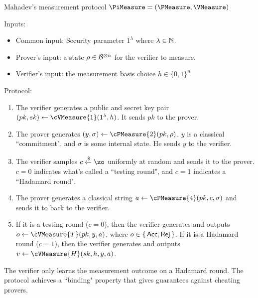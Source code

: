\begin{protocol}{Mahadev's measurement protocol $\PiMeasure=(\PMeasure, \VMeasure)$}
\label{proto:urmila4}


Inputs:
\begin{itemize}
	\item Common input: Security parameter $1^\lambda$ where $\lambda\in\mathbb{N}$.
	\item Prover's input: a state $\rho\in\mathcal{B}^{\otimes n}$ for the verifier to measure.
	\item Verifier's input:
	    the measurement basis choice $h \in \{0,1\}^n$ 
\end{itemize}

Protocol:
\begin{enumerate}
	\item \label{step:measure1} The verifier generates a public and secret key pair $(pk, sk)\leftarrow\cVMeasure{1}(1^\lambda, h)$. It sends $pk$ to the prover.
	\item \label{step:measure2} The prover generates $(y, \sigma)\leftarrow\cPMeasure{2}(pk, \rho)$.
		$y$ is a classical ``commitment", and $\sigma$ is some internal state.
		He sends $y$ to the verifier.
	\item \label{step:measure3} The verifier samples $c\xleftarrow{\$}\zo$ uniformly at random and sends it to the prover. $c=0$ indicates what's called a ``testing round", and $c=1$ indicates a ``Hadamard round".
	\item \label{step:measure4} The prover generates a classical string $a\leftarrow\cPMeasure{4}(pk, c, \sigma)$ and sends it to back to the verifier.
	\item \label{step:output} If it is a testing round ($c=0$), then the verifier generates and outputs $o\leftarrow\cVMeasure{T}(pk, y, a)$, where $o\in\set{\mathsf{Acc}, \mathsf{Rej}}$. 
		If it is a Hadamard round ($c=1$), then the verifier generates and outputs $v\leftarrow\cVMeasure{H}(sk, h, y, a)$.
\end{enumerate}
\end{protocol}

The verifier only learns the measurement outcome on a Hadamard round.
The protocol achieves a ``binding" property that gives guarantees against cheating provers.


